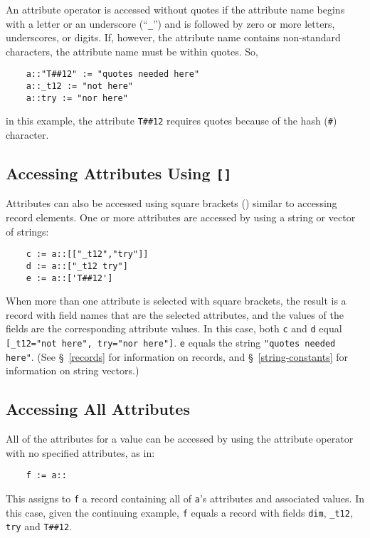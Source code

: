 An attribute operator is accessed without quotes if the
attribute name begins with a letter or an underscore (``{\tt \_}'') and
is followed by zero or more letters, underscores, or digits. If, however,
the attribute name contains non-standard characters, the attribute name must
be within quotes. So,
\begin{verbatim}
    a::"T##12" := "quotes needed here"
    a::_t12 := "not here"
    a::try := "nor here"
\end{verbatim}
in this example, the attribute \verb-T##12- requires quotes because of the hash (\verb-#-)
character. 

\subsection{Accessing Attributes Using {\tt []}}
\label{attribute-brackets}

Attributes can also be accessed using square brackets
()
similar to accessing  record elements.
One or more attributes are  accessed by using a string or vector of strings:
\begin{verbatim}
    c := a::[["_t12","try"]]
    d := a::["_t12 try"]
    e := a::['T##12']
\end{verbatim}
When more than one attribute is selected with square brackets, the result is a
record with field names that are the selected attributes, and the values of the fields
are the corresponding attribute values. In this case, both {\tt c} and {\tt d} equal
\verb-[_t12="not here", try="nor here"]-. {\tt e} equals the string {\tt "quotes needed here"}.
(See \S~\ref{records} for information on records, and \S~\ref{string-constants} for 
information on string vectors.)

\subsection{Accessing All Attributes}
\label{attribute-wildcard}

All of the attributes for a value can be accessed by using the attribute operator
with no specified attributes, as in:
\begin{verbatim}
    f := a::
\end{verbatim}
This assigns to {\tt f} a record containing all of {\tt a}'s attributes
and  associated values. In this case, given the continuing example, {\tt f}
equals a record with fields {\tt dim}, \verb-_t12-, {\tt try} and \verb-T##12-.

